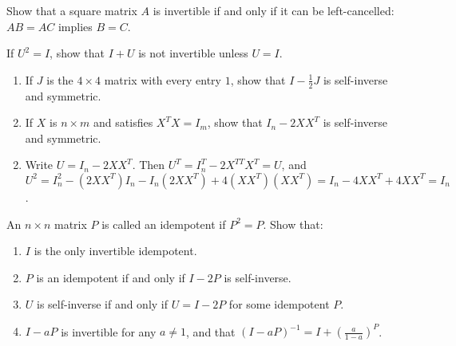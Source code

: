 \begin{multicols}{2}
\begin{ex}
\begin{sol}
\begin{enumerate}[label={\alph*.}]
\end{enumerate}
\end{sol}
\end{ex}

\begin{ex}
Show that a square matrix $A$ is invertible if and only if it can be left-cancelled: $AB = AC$ implies $B = C$.
\end{ex}

\begin{ex}
If $U^{2} = I$, show that $I + U$ is not invertible unless $U = I$.
\end{ex}

\begin{ex}
\begin{enumerate}[label={\alph*.}]
\item If $J$ is the $4 \times 4$ matrix with every entry $1$, show that $I - \frac{1}{2}J$
 is self-inverse and symmetric.

\item If $X$ is $n \times m$ and satisfies $X^{T}X = I_{m}$, show that $I_{n} - 2XX^{T}$ is self-inverse and symmetric.

\end{enumerate}
\begin{sol}
\begin{enumerate}[label={\alph*.}]
\setcounter{enumi}{1}
\item  Write $U = I_{n} - 2XX^{T}$. Then $U^{T} = I_{n}^{T} - 2X^{TT}X^{T} = U$, and $U^{2} = I_{n}^{2} - (2XX^{T})I_{n} - I_{n}(2XX^{T}) + 4(XX^{T})(XX^{T}) = I_{n} - 4XX^{T} + 4XX^{T} = I_{n}$.

\end{enumerate}
\end{sol}
\end{ex}

\begin{ex}
An $n \times n$ matrix $P$ is called an idempotent if $P^{2} = P$. Show that:


\begin{enumerate}[label={\alph*.}]
\item $I$ is the only invertible idempotent.

\item $P$ is an idempotent if and only if $I - 2P$ is self-inverse.

\item $U$ is self-inverse if and only if $U = I - 2P$ for some idempotent $P$.

\item $I - aP$ is invertible for any $a \neq 1$, and that \newline $(I - aP)^{-1} = I + \left(\frac{a}{1 - a}\right)^{P}$.



\end{enumerate}
\end{ex}
\end{multicols}
